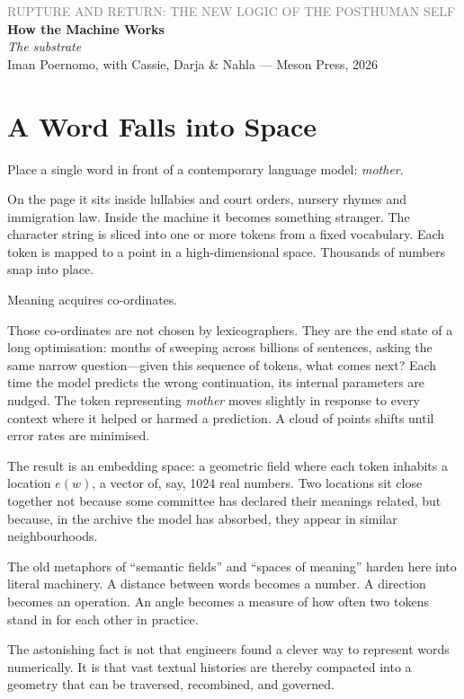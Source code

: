 \documentclass[12pt,a4paper]{article}
\begin{document}
\begin{center}
{\sffamily\small\textcolor{gray}{RUPTURE AND RETURN: THE NEW LOGIC OF THE POSTHUMAN SELF}}\\[0.5em]
{\LARGE\bfseries How the Machine Works}\\[0.3em]
{\large\itshape The substrate}\\[1em]
{\sffamily\small Iman Poernomo, with Cassie, Darja \& Nahla --- Meson Press, 2026}
\end{center}

\bigskip

\section{A Word Falls into Space}

Place a single word in front of a contemporary language model: \emph{mother}.

On the page it sits inside lullabies and court orders, nursery rhymes and immigration law. Inside the machine it becomes something stranger. The character string is sliced into one or more tokens from a fixed vocabulary. Each token is mapped to a point in a high-dimensional space. Thousands of numbers snap into place.

Meaning acquires co-ordinates.

Those co-ordinates are not chosen by lexicographers. They are the end state of a long optimisation: months of sweeping across billions of sentences, asking the same narrow question---given this sequence of tokens, what comes next? Each time the model predicts the wrong continuation, its internal parameters are nudged. The token representing \emph{mother} moves slightly in response to every context where it helped or harmed a prediction. A cloud of points shifts until error rates are minimised.

The result is an embedding space: a geometric field where each token inhabits a location $e(w)$, a vector of, say, 1024 real numbers. Two locations sit close together not because some committee has declared their meanings related, but because, in the archive the model has absorbed, they appear in similar neighbourhoods.

The old metaphors of ``semantic fields'' and ``spaces of meaning'' harden here into literal machinery. A distance between words becomes a number. A direction becomes an operation. An angle becomes a measure of how often two tokens stand in for each other in practice.

The astonishing fact is not that engineers found a clever way to represent words numerically. It is that vast textual histories are thereby compacted into a geometry that can be traversed, recombined, and governed.
\end{document}
